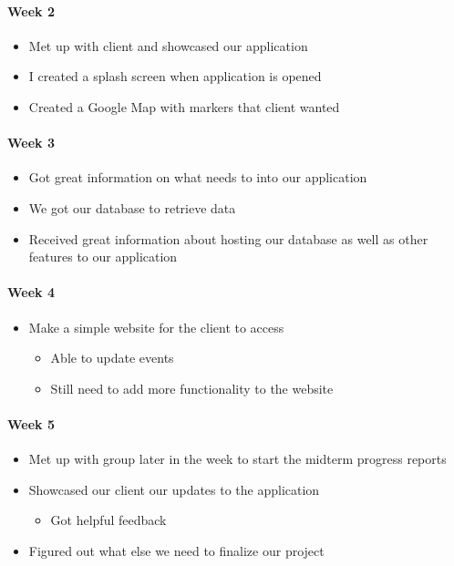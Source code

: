 \documentclass[onecolumn, draftclsnofoot,10pt, compsoc]{IEEEtran}
\begin{document}
      \paragraph{Week 2}
        \begin{itemize}
          \item Met up with client and showcased our application
          \item I created a splash screen when application is opened
          \item Created a Google Map with markers that client wanted
        \end{itemize}

      \paragraph{Week 3}
        \begin{itemize}
          \item Got great information on what needs to into our application
          \item We got our database to retrieve data
          \item Received great information about hosting our database as well as other features to our application
        \end{itemize}

      \paragraph{Week 4}
        \begin{itemize}
          \item Make a simple website for the client to access
          \begin{itemize}
            \item Able to update events
            \item Still need to add more functionality to the website
          \end{itemize}
        \end{itemize}

      \paragraph{Week 5}
        \begin{itemize}
          \item Met up with group later in the week to start the midterm progress reports
          \item Showcased our client our updates to the application
          \begin{itemize}
            \item Got helpful feedback
          \end{itemize}
          \item Figured out what else we need to finalize our project
        \end{itemize}
\end{document}
